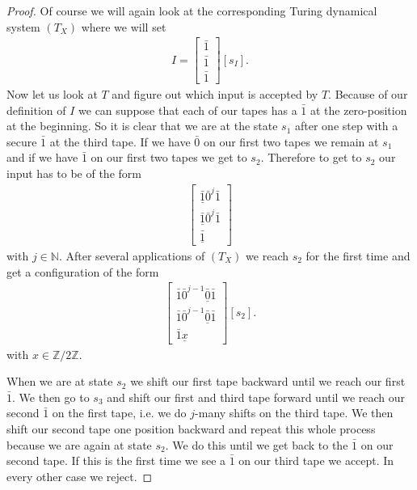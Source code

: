 \documentclass[12pt,a4paper]{scrartcl}
\theoremstyle{plain}
\theoremstyle{definition}
\newcommand{\N}{\mathbb{N}} %
\newcommand{\2}{\mathbb{Z} / 2 \mathbb{Z}}
\newcommand{\1}{\bar{1}}
\newcommand{\0}{\bar{0}}
\begin{document}
\begin{proof}
	Of course we will again look at the corresponding Turing dynamical system $(T_X)$ where we will set 
	\begin{align*}
		I = \begin{bmatrix}
		\1 \\
		\1 \\
		\1 
		\end{bmatrix}[s_I].
	\end{align*}
	Now let us look at $T$ and figure out which input is accepted by $T$. Because of our definition of $I$ we can suppose that each of our tapes has a $\1$ at the zero-position at the beginning. So it is clear that we are at the state $s_1$ after one step with a secure $\1$ at the third tape. If we have $\0$ on our first two tapes we remain at $s_1$ and if we have $\1$ on our first two tapes we get to $s_2$. Therefore to get to $s_2$ our input has to be of the form 
	\begin{align*}
		\begin{bmatrix}
			\underline{\1} \0^j \1 \\
			\underline{\1} \0^j \1 \\
			\underline{\1} 
		\end{bmatrix}
	\end{align*}
	with $j \in \N$. After several applications of $(T_X)$ we reach $s_2$ for the first time and get a configuration of the form 
	\begin{align*}
		\begin{bmatrix}
		\1 \0^{j-1} \underline{\0}  \1 \\
		\1 \0^{j-1} \underline{\0}  \1 \\
		\1 \underline{x} 
	\end{bmatrix}[s_2].
	\end{align*}
	with $x \in \2$.
	
	When we are at state $s_2$ we shift our first tape backward until we reach our first $\1$. We then go to $s_3$ and shift our first and third tape forward until we reach our second $\1$ on the first tape, i.e. we do $j$-many shifts on the third tape. We then shift our second tape one position backward and repeat this whole process because we are again at state $s_2$. We do this until we get back to the $\1$ on our second tape. If this is the first time we see a $\1$ on our third tape we accept. In every other case we reject.
	

\end{proof}
\end{document}
